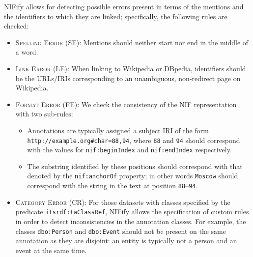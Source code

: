 \documentclass[sigconf]{acmart}
\begin{document}
NIFify allows for detecting possible errors present in terms of the mentions and the identifiers to which they are linked; specifically, the following rules are checked:


\begin{itemize} 
\item \textsc{Spelling Error} (SE): Mentions should neither start nor end in the middle of a word.
\item \textsc{Link Error} (LE): When linking to Wikipedia or DBpedia, identifiers should be the URLs/IRIs corresponding to an unambiguous, non-redirect page on Wikipedia.
\item \textsc{Format Error} (FE): We check the consistency of the NIF representation with two sub-rules:
\begin{itemize}
\item Annotations are typically assigned a subject IRI of the form \texttt{http://example.org\#char=88,94}, where \texttt{88} and \texttt{94} should correspond with the values for \texttt{nif:beginIndex} and \texttt{nif:endIndex} respectively.
\item The substring identified by these positions should correspond with that denoted by the \texttt{nif:anchorOf} property; in other words \texttt{Moscow} should correspond with the string in the text at position \texttt{88}--\texttt{94}.
\end{itemize}
\item \textsc{Category Error} (CR): For those datasets with classes specified by the predicate \texttt{itsrdf:taClassRef}, NIFify allows the specification of custom rules in order to detect inconsistencies in the annotation classes. For example, the classes \texttt{dbo:Person} and \texttt{dbo:Event} should not be present on the same annotation as they are disjoint: an entity is typically not a person and an event at the same time.
\end{itemize}
\end{document}
